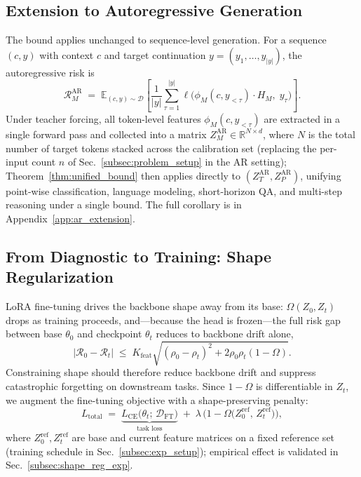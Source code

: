 \documentclass{article}
\begin{document}
\subsection{Extension to Autoregressive Generation}
\label{subsec:ar_extension}

The bound applies unchanged to sequence-level generation. For a sequence $(c, y)$ with context $c$ and target continuation $y = (y_1, \ldots, y_{|y|})$, the autoregressive risk is
\begin{equation}
\label{eq:ar_risk}
\mathcal{R}_M^{\mathrm{AR}} \;=\; \mathbb{E}_{(c, y) \sim \mathcal{D}} \!\left[ \frac{1}{|y|} \sum_{\tau=1}^{|y|} \ell\!\big(\phi_M(c, y_{<\tau}) \cdot H_M,\; y_\tau\big) \right].
\end{equation}
Under teacher forcing, all token-level features $\phi_M(c, y_{<\tau})$ are extracted in a single forward pass and collected into a matrix $Z_M^{\mathrm{AR}} \in \mathbb{R}^{N \times d}$, where $N$ is the total number of target tokens stacked across the calibration set (replacing the per-input count $n$ of Sec.~\ref{subsec:problem_setup} in the AR setting); Theorem~\ref{thm:unified_bound} then applies directly to $(Z_T^{\mathrm{AR}}, Z_P^{\mathrm{AR}})$, unifying point-wise classification, language modeling, short-horizon QA, and multi-step reasoning under a single bound. The full corollary is in Appendix~\ref{app:ar_extension}.


\subsection{From Diagnostic to Training: Shape Regularization}
\label{subsec:shape_reg}

LoRA fine-tuning drives the backbone shape away from its base: $\Omega(Z_0, Z_t)$ drops as training proceeds, and---because the head is frozen---the full risk gap between base $\theta_0$ and checkpoint $\theta_t$ reduces to backbone drift alone,
\begin{equation}
\label{eq:lora_bound}
|\mathcal{R}_0 - \mathcal{R}_t| \;\le\; K_{\mathrm{feat}}\sqrt{(\rho_0-\rho_t)^2 + 2\rho_0\rho_t(1-\Omega)}.
\end{equation}
Constraining shape should therefore reduce backbone drift and suppress catastrophic forgetting on downstream tasks. Since $1 - \Omega$ is differentiable in $Z_t$, we augment the fine-tuning objective with a shape-preserving penalty:
\begin{equation}
\label{eq:shape_reg}
L_{\mathrm{total}} \;=\; \underbrace{L_{\mathrm{CE}}\bigl(\theta_t;\,\mathcal{D}_{\mathrm{FT}}\bigr)}_{\text{task loss}} \;+\; \lambda\,\bigl(1 - \Omega\!\bigl(Z_0^{\text{ref}},\, Z_t^{\text{ref}}\bigr)\bigr),
\end{equation}
where $Z_0^{\text{ref}}, Z_t^{\text{ref}}$ are base and current feature matrices on a fixed reference set (training schedule in Sec.~\ref{subsec:exp_setup}); empirical effect is validated in Sec.~\ref{subsec:shape_reg_exp}.
\end{document}
